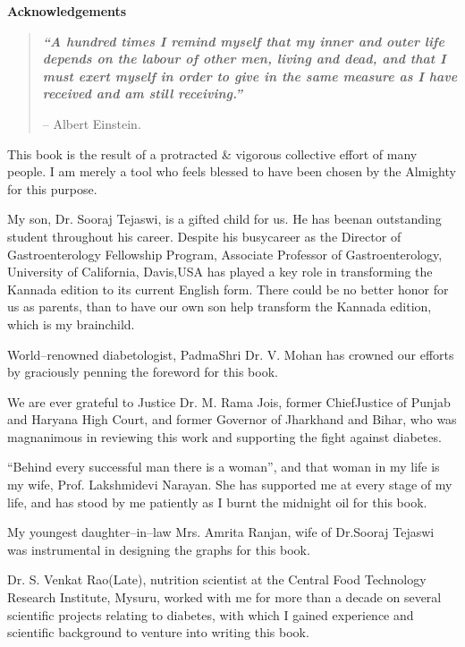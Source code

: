 \thispagestyle{empty}

\begin{center}
\Huge\textbf{Acknowledgements}
\end{center}

\vskip 20pt

\begin{quote}
\textbf{\textit{“A hundred times I remind myself that my inner and outer life depends on the labour of other men, living and dead, and that I must exert myself in order to give in the same measure as I have received and am still receiving.”}}
\begin{flushright}
– Albert Einstein.
\end{flushright}
\end{quote}

This book is the result of a protracted \& vigorous collective effort of many people. I am merely a tool who feels blessed to have been chosen by the Almighty for this purpose.

My son, Dr. Sooraj Tejaswi, is a gifted child for us. He has been\break an outstanding student throughout his career. Despite his busy\break career as the Director of Gastroenterology Fellowship Program, Asso\-ciate Professor of Gastroenterology, University of California, Davis,\break USA has played a key role in transforming the Kannada edition to its current English form. There could be no better honor for us as parents, than to have our own son help transform the Kannada edition, which is my brainchild.

World–renowned diabetologist, PadmaShri Dr. V. Mohan has crow\-ned our efforts by graciously penning the foreword for this book.

We are ever grateful to Justice Dr. M. Rama Jois, former Chief\break Justice of Punjab and Haryana High Court, and former Governor of Jharkhand and Bihar, who was magnanimous in reviewing this work and supporting the fight against diabetes.

 “Behind every successful man there is a woman”, and that woman in my life is my wife, Prof. Lakshmidevi Narayan. She has supported me at every stage of my life, and has stood by me patiently as I burnt the midnight oil for this book.

My youngest daughter–in–law Mrs. Amrita Ranjan, wife of Dr.Sooraj Tejaswi was instrumental in designing the graphs for this book.

Dr. S. Venkat Rao(Late), nutrition scientist at the Central Food Technology Research Institute, Mysuru, worked with me for more than a decade on several scientific projects relating to diabetes, with which I gained experience and scientific background to venture into writing this book.

